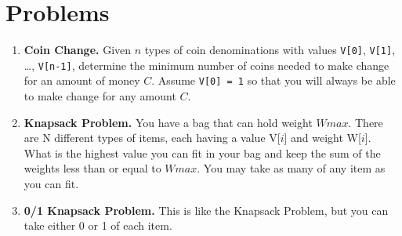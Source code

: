 \documentclass[11pt]{article}
\begin{document}
\section{Problems}
\begin{enumerate}
\item \textbf{Coin Change.} Given $n$ types of coin denominations with values \texttt{V[0]}, \texttt{V[1]}, \dots, \texttt{V[n-1]}, determine the minimum number of coins needed to make change for an amount of money $C$. Assume \texttt{V[0] = 1} so that you will always be able to make change for any amount $C$.
\item \textbf{Knapsack Problem.} You have a bag that can hold weight $Wmax$.  There are N different types of items, each having a value V[$i$] and weight W[$i$].  What is the highest value you can fit in your bag and keep the sum of the weights less than or equal to $Wmax$.  You may take as many of any item as you can fit.
\item \textbf{0/1 Knapsack Problem.} This is like the Knapsack Problem, but you can take either 0 or 1 of each item.
\end{enumerate}
\end{document}
